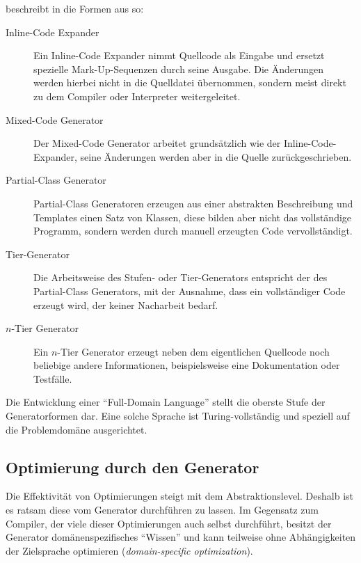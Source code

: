 \citeauthor{herrington2003code} beschreibt in \cite[Kapitel 4][]{herrington2003code} die Formen aus  so:
\begin{description}
    \item[Inline-Code Expander]
        Ein Inline-Code Expander nimmt Quellcode als Eingabe und ersetzt spezielle Mark-Up-Sequenzen durch seine Ausgabe. Die Änderungen werden hierbei nicht in die Quelldatei übernommen, sondern meist direkt zu dem Compiler oder Interpreter weitergeleitet.
    \item[Mixed-Code Generator]
        Der Mixed-Code Generator arbeitet grundsätzlich wie der Inline-Code-Expander, seine Änderungen werden aber in die Quelle zurückgeschrieben.
    \item[Partial-Class Generator]
        Partial-Class Generatoren erzeugen aus einer abstrakten Beschreibung und Templates einen Satz von Klassen, diese bilden aber nicht das vollständige Programm, sondern werden durch manuell erzeugten Code vervollständigt.
    \item[Tier-Generator]
        Die Arbeitsweise des Stufen- oder Tier-Generators entspricht der des Partial-Class Generators, mit der Ausnahme, dass ein vollständiger Code erzeugt wird, der keiner Nacharbeit bedarf.
    \item[$n$-Tier Generator] 
        Ein $n$-Tier Generator erzeugt neben dem eigentlichen Quellcode noch beliebige andere Informationen, beispielsweise eine Dokumentation oder Testfälle.
\end{description}

Die Entwicklung einer \enquote{Full-Domain Language} stellt die oberste Stufe der Generatorformen dar. Eine solche Sprache ist Turing-vollständig und speziell auf die Problemdomäne ausgerichtet.

\subsection{Optimierung durch den Generator}

Die Effektivität von Optimierungen steigt mit dem Abstraktionslevel. Deshalb ist es ratsam diese vom Generator durchführen zu lassen. Im Gegensatz zum Compiler, der viele dieser Optimierungen auch selbst durchführt, besitzt der Generator domänenspezifisches \enquote{Wissen} und kann teilweise ohne Abhängigkeiten der Zielsprache optimieren (\emph{domain-specific optimization}).


